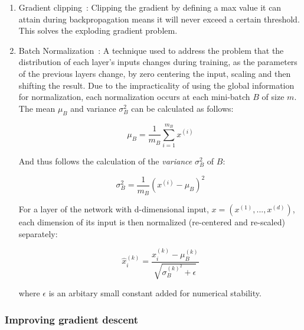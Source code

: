 \documentclass[english, bibtex]{kththesis}
\begin{document}
\begin{enumerate}
\item Gradient clipping~\cite{quintana1974clipping}: Clipping the gradient by defining a max value it can attain during backpropagation means it will never exceed a certain threshold. This solves the exploding gradient problem.

\item Batch Normalization~\cite{ioffe2015batch}: A technique used to address the problem that the distribution of each layer’s inputs changes during training, as the parameters of the previous layers change, by zero centering the input, scaling and then shifting the result. Due to the impracticality of using the global information for normalization, each normalization occurs at each mini-batch $B$ of size $m$. The mean $\mu_{B}$ and variance $\sigma_B^2$ can be calculated as follows:

\begin{equation}
    \mu_B = \frac{1}{m_B} \sum_{i=1}^{m_B} x^{(i)}
    \label{eqn:bnmean}
\end{equation}

And thus follows the calculation of the \textit{variance} $\sigma_B^2$ of $B$:

\begin{equation}
    \sigma_B^2 = \frac{1}{m_B} (x^{(i)} - \mu_B)^2
    \label{eqn:bnvariance}
\end{equation}

For a layer of the network with d-dimensional input, $ x = (x^{(1)}, ..., x^{(d)}) $, each dimension of its input is then normalized (re-centered and re-scaled) separately:

\begin{equation}
    \hat{x}_{i}^{(k)} = \frac{x_{i}^{(k)} - \mu_{B}^{(k)}}{\sqrt{\sigma_{B}^{(k)^2} + \epsilon}}
    \label{eqn:bnorm}
\end{equation}

where $\epsilon$ is an arbitary small constant added for numerical stability.

\end{enumerate}
\subsubsection{Improving gradient descent}
\end{document}
